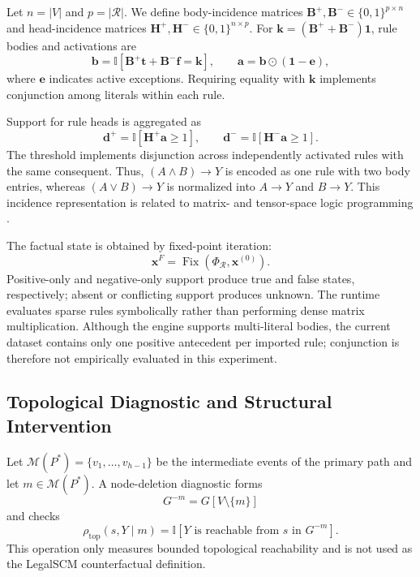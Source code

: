 Let $n=|V|$ and $p=|\mathcal{R}|$. We define body-incidence matrices
$\mathbf{B}^{+},\mathbf{B}^{-}\in\{0,1\}^{p\times n}$ and head-incidence
matrices $\mathbf{H}^{+},\mathbf{H}^{-}\in\{0,1\}^{n\times p}$. For
$\mathbf{k}=(\mathbf{B}^{+}+\mathbf{B}^{-})\mathbf{1}$, rule bodies and
activations are
\begin{equation}
\mathbf{b}
=
\mathbb{I}
[\mathbf{B}^{+}\mathbf{t}
+\mathbf{B}^{-}\mathbf{f}
=\mathbf{k}],
\qquad
\mathbf{a}
=
\mathbf{b}\odot(\mathbf{1}-\mathbf{e}),
\label{eq:rule_activation}
\end{equation}
where $\mathbf{e}$ indicates active exceptions. Requiring equality with
$\mathbf{k}$ implements conjunction among literals within each rule.

Support for rule heads is aggregated as
\begin{equation}
\mathbf{d}^{+}
=
\mathbb{I}[\mathbf{H}^{+}\mathbf{a}\geq1],
\qquad
\mathbf{d}^{-}
=
\mathbb{I}[\mathbf{H}^{-}\mathbf{a}\geq1].
\label{eq:head_support}
\end{equation}
The threshold implements disjunction across independently activated rules with
the same consequent. Thus, $(A\land B)\rightarrow Y$ is encoded as one rule
with two body entries, whereas $(A\lor B)\rightarrow Y$ is normalized into
$A\rightarrow Y$ and $B\rightarrow Y$. This incidence representation is
related to matrix- and tensor-space logic programming
\cite{sakama2021tensor}.

The factual state is obtained by fixed-point iteration:
\begin{equation}
\mathbf{x}^{F}
=
\operatorname{Fix}
(\Phi_{\mathcal{R}},\mathbf{x}^{(0)}).
\label{eq:factual_fixed_point}
\end{equation}
Positive-only and negative-only support produce true and false states,
respectively; absent or conflicting support produces unknown. The runtime
evaluates sparse rules symbolically rather than performing dense matrix
multiplication. Although the engine supports multi-literal bodies, the current
dataset contains only one positive antecedent per imported rule; conjunction is
therefore not empirically evaluated in this experiment.

\subsection{Topological Diagnostic and Structural Intervention}

Let $\mathcal{M}(P^*)=\{v_1,\ldots,v_{h-1}\}$ be the intermediate events of the
primary path and let $m\in\mathcal{M}(P^*)$. A node-deletion diagnostic forms
\begin{equation}
G^{-m}=G[V\setminus\{m\}]
\end{equation}
and checks
\begin{equation}
\rho_{\mathrm{top}}(s,Y\mid m)
=
\mathbb{I}
[Y\text{ is reachable from }s\text{ in }G^{-m}].
\label{eq:topological_ablation}
\end{equation}
This operation only measures bounded topological reachability and is not used
as the LegalSCM counterfactual definition.

